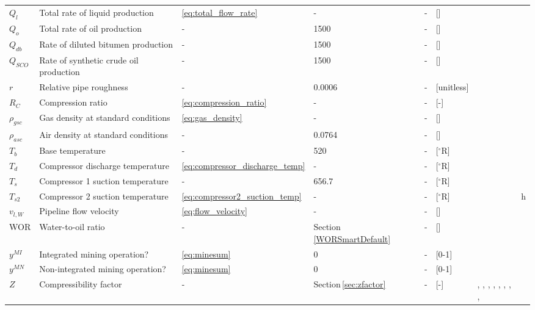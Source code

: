 \documentclass[11pt]{report}
\begin{document}
{\begin{landscape}
\begin{scriptsize}
\begin{supertabular*}{1\columnwidth}{p{0.05\columnwidth}p{0.25\columnwidth}p{0.05\columnwidth}p{0.1\columnwidth}p{0.1\columnwidth}p{0.15\columnwidth}p{0.085\columnwidth}p{0.045\columnwidth}}
$Q_{l}$ & Total rate of liquid production & \eqref{eq:total_flow_rate} & - & - & [] & & \\
$Q_{o}$ & Total rate of oil production & - & 1500 & - & [] & & \\
$Q_{db}$ & Rate of diluted bitumen production & - & 1500 & - & [] & & \\
$Q_{SCO}$ & Rate of synthetic crude oil production & - & 1500 & - & [] & & \\
$r$ & Relative pipe roughness & - & 0.0006 &- &[unitless] & \cite{Cengel2005} \\
$R_{C}$ & Compression ratio & \eqref{eq:compression_ratio} & - & - & [-] & & \\
$\rho _{gsc}$ & Gas density at standard conditions & \eqref{eq:gas_density} & - & - & [] & \cite[p. 35]{Manning1991} & \\
$\rho _{asc}$ & Air density at standard conditions & - & 0.0764 & - & [] & \cite[p. 10]{Takacs2005} & \\
$T_{b}$ & Base temperature & - & 520 & - & [$^{\circ}$R] & \cite[p. 35]{Manning1991} & \\
$T_{d}$ & Compressor discharge temperature & \eqref{eq:compressor_discharge_temp} & - & - & [$^{\circ}$R] & \cite[p. 105]{Jarrell2002} & \\
$T_{s}$ & Compressor 1 suction temperature & - & 656.7 & - & [$^{\circ}${R}] & & \\
$T_{s2}$ & Compressor 2 suction temperature & \eqref{eq:compressor2_suction_temp} & - & - & [$^{\circ}${R}] & & h\\
$v_{l,W}$ & Pipeline flow velocity & \eqref{eq:flow_velocity} & - & - & [] & \cite{Takacs2005} & \\
WOR & Water-to-oil ratio & - & Section\,\ref{WORSmartDefault} & - & [] & & \\
$y^{MI}$ & Integrated mining operation? & \eqref{eq:minesum} & 0 & - & [0-1] & & \\
$y^{MN}$ & Non-integrated mining operation? & \eqref{eq:minesum} & 0 & - & [0-1] & & \\
$Z$ & Compressibility factor & - & Section\,\ref{sec:zfactor} & - & [-] & \cite{SpanLemmon2000}, \cite{SpanWagner1996}, \cite{LemmonJacobsen2000}, \cite{SchmidtWagner1985}, \cite{REFPROP},  \cite[p. 111]{Mccain1990}, \cite{StewartBurkhardtVoo1959}, \cite{WichertAziz1972}, \cite{Standing1977} & \\

\end{supertabular*}
\end{scriptsize}
\end{landscape}}
\end{document}
